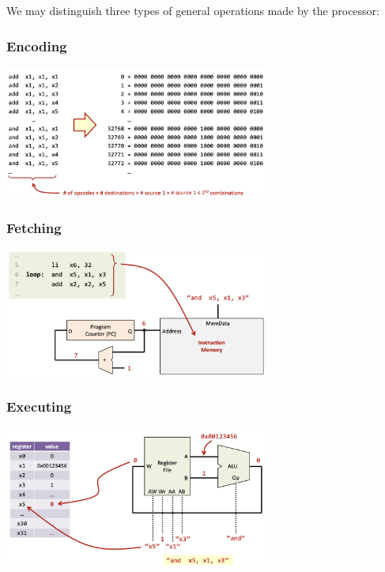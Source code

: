 We may distinguish three types of general operations made by the processor: \newline
\subsubsection*{Encoding}
\begin{center}
    \includegraphics[width=0.65\textwidth]{chapters/chapter1a/images/encoding.png}
\end{center}
\subsubsection*{Fetching}
\begin{center}
    \includegraphics[width=0.65\textwidth]{chapters/chapter1a/images/fetching.png}
\end{center}
\subsubsection*{Executing}
\begin{center}
    \includegraphics[width=0.65\textwidth]{chapters/chapter1a/images/executing.png}
\end{center}


